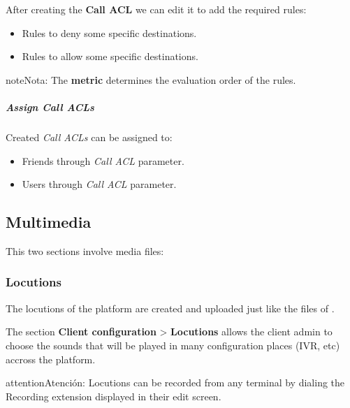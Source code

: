 \documentclass[letterpaper,10pt,spanish]{sphinxmanual}
\begin{document}
After creating the \textbf{Call ACL} we can edit it to add the required rules:
\begin{itemize}
\item {} 
Rules to deny some specific destinations.

\item {} 
Rules to allow some specific destinations.

\end{itemize}

\begin{notice}{note}{Nota:}
The \textbf{metric} determines the evaluation order of the rules.
\end{notice}


\subparagraph{Assign Call ACLs}
\label{administration_portal/client/vpbx/user_configuration/call_acls:assign-call-acls}
Created \emph{Call ACLs} can be assigned to:
\begin{itemize}
\item {} 
Friends through \emph{Call ACL} parameter.

\item {} 
Users through \emph{Call ACL} parameter.

\end{itemize}


\subsection{Multimedia}
\label{administration_portal/client/vpbx/multimedia/index:multimedia}\label{administration_portal/client/vpbx/multimedia/index::doc}
This two sections involve media files:


\subsubsection{Locutions}
\label{administration_portal/client/vpbx/multimedia/locutions:locutions}\label{administration_portal/client/vpbx/multimedia/locutions::doc}
The locutions of the platform are created and uploaded just like the files of
{\hyperref[administration_portal/client/vpbx/multimedia/music_on_hold:musiconhold]{}}.

The section \textbf{Client configuration} \textgreater{} \textbf{Locutions}  allows the client admin
to choose the sounds that will be played in many configuration places (IVR, etc)
accross the platform.

\begin{notice}{attention}{Atención:}
Locutions can be recorded from any terminal by dialing the
Recording extension displayed in their edit screen.
\end{notice}
\end{document}
